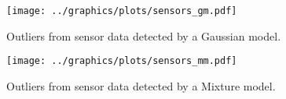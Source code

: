 \begin{figure}[h]
\centering
\texttt{[image: ../graphics/plots/sensors\_gm.pdf]}
\caption{Outliers from sensor data detected by a Gaussian model.}
\label{fig:sensors_1k_gm}
\end{figure}
\begin{figure}[h]
\centering
\texttt{[image: ../graphics/plots/sensors\_mm.pdf]}
\caption{Outliers from sensor data detected by a Mixture model.}
\label{fig:sensors_1k_mm}
\end{figure}
